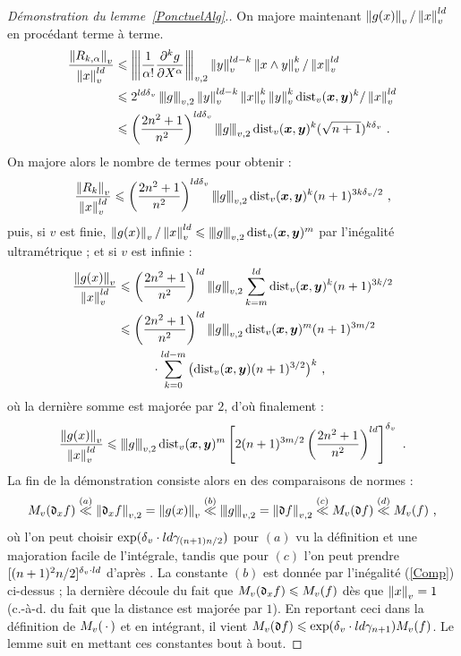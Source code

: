 \documentclass[11pt, twoside, a4paper]{article}
\theoremstyle{remark}
\begin{document}
\begin{proof}[Démonstration du lemme~\ref{PonctuelAlg}.]
 On majore maintenant $\nv {g(x)} / \nv x ^{ld}$ en procédant terme à terme.
 \begin{align*}
  \frac {\nv{R_{k, \alpha}}} {\nv x ^{ld}}
   & \le \nnv[v, 2]{\frac1{\alpha!}\frac{\partial^kg}{\partial X^\alpha}} \nv y^{ld-k} \nv{x \wedge y}^k / \nv x^{ld} \\
   & \le 2^{ld\dv} \nnv[v, 2]g \nv y^{ld-k} \nv x^k \nv y^k \Dv(\p x, \p y)^k / \nv x^{ld} \\
   & \le \left(\frac{2n^2+1}{n^2}\right)^{ld\dv} \nnv[v, 2]g \Dv(\p x, \p y)^k (\sqrt{n+1})^{k\dv} \pmm.
 \end{align*}
 On majore alors le nombre de termes pour obtenir :
 \[
  \frac{\nv{R_k}}{\nv x^{ld}} \le \left(\frac{2n^2+1}{n^2}\right)^{ld\dv} \nnv[v, 2]g \Dv(\p x, \p y)^k (n+1)^{3k\dv/2} \pmm,
 \]
 puis, si $v$ est finie, $\nv {g(x)} / \nv x ^{ld} \le \nnv[v, 2]g \Dv(\p x, \p y)^m$ par l'inégalité ultramétrique ; et si $v$ est infinie :
 \begin{align*}
  \frac{\nv{g(x)}}{\nv x^{ld}}
   & \le \left(\frac{2n^2+1}{n^2}\right)^{ld} \nnv[v, 2]g \sum_{k=m}^{ld} \Dv(\p x, \p y)^k (n+1)^{3k/2} \\
   & \le \left(\frac{2n^2+1}{n^2}\right)^{ld} \nnv[v, 2]g \Dv(\p x, \p y)^m (n+1)^{3m/2} \\
   & \phantom{\le} \qquad \cdot \sum_{k=0}^{ld-m} \big(\Dv(\p x, \p y) (n+1)^{3/2}\big)^k \pmm,
 \end{align*}
 où la dernière somme est majorée par $2$, d'où finalement :
 \begin{equation} \label{Comp}
  \frac{\nv{g(x)}}{\nv x^{ld}} \le \nnv[v, 2]g \Dv(\p x, \p y)^m \left[ 2 (n+1)^{3m/2} \left(\frac{2n^2+1}{n^2}\right)^{ld}\right]^\dv \pmm.
 \end{equation}
 La fin de la démonstration consiste alors en des comparaisons de normes :
 \[
  \mv{\md_x f} \stackrel{(a)}{\ll} \nv[v, 2]{\md_x f} = \nv{g(x)} \stackrel{(b)}{\ll} \nnv[v, 2] g = \nv[v, 2]{\md f} \stackrel{(c)}{\ll} \mv{\md f} \stackrel{(d)}{\ll} \mv f \pmm,
 \]
 où l'on peut choisir $\exp(\dv \cdot ld \gamma_{(n+1)n/2})$ pour $(a)$ vu la définition et une majoration facile de l'intégrale, tandis que pour $(c)$ l'on peut prendre $[(n+1)^2n/2]^{\dv\cdot ld}$ d'après \cite[dém. du lemme~3.3]{rem1}. La constante $(b)$ est donnée par l'inégalité (\ref{Comp}) ci-dessus ; la dernière découle du fait que $\mv{\md_x f} \le \mv{f}$ dès que $\nv x = 1$ (c.-à-d. du fait que la distance est majorée par $1$). En reportant ceci dans la définition de $\mv{\truc}$ et en intégrant, il vient $\mv{\md f} \le \exp(\dv\cdot ld \gamma_{n+1}) \mv f$. Le lemme suit en mettant ces constantes bout à bout.
\end{proof}
\end{document}
